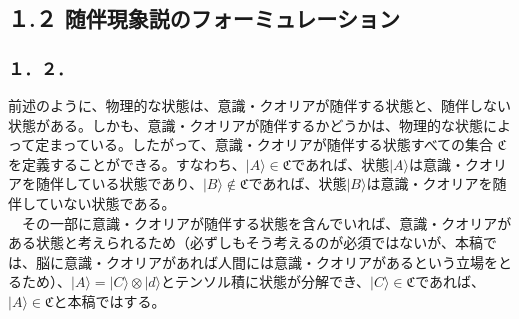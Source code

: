 \subsection{１.２ 随伴現象説のフォーミュレーション}
\subsubsection{１．２．}
前述のように、物理的な状態は、意識・クオリアが随伴する状態と、随伴しない状態がある。しかも、意識・クオリアが随伴するかどうかは、物理的な状態によって定まっている。したがって、意識・クオリアが随伴する状態すべての集合 $\mathfrak{C}$ を定義することができる。すなわち、$|A\rangle\in\mathfrak{C}$であれば、状態$|A\rangle$は意識・クオリアを随伴している状態であり、$|B\rangle\notin\mathfrak{C}$であれば、状態$|B\rangle$は意識・クオリアを随伴していない状態である。\\
　その一部に意識・クオリアが随伴する状態を含んでいれば、意識・クオリアがある状態と考えられるため（必ずしもそう考えるのが必須ではないが、本稿では、脳に意識・クオリアがあれば人間には意識・クオリアがあるという立場をとるため）、$|A\rangle = |C\rangle\otimes |d\rangle$とテンソル積に状態が分解でき、$|C\rangle\in\mathfrak{C}$であれば、$|A\rangle\in\mathfrak{C}$と本稿ではする。